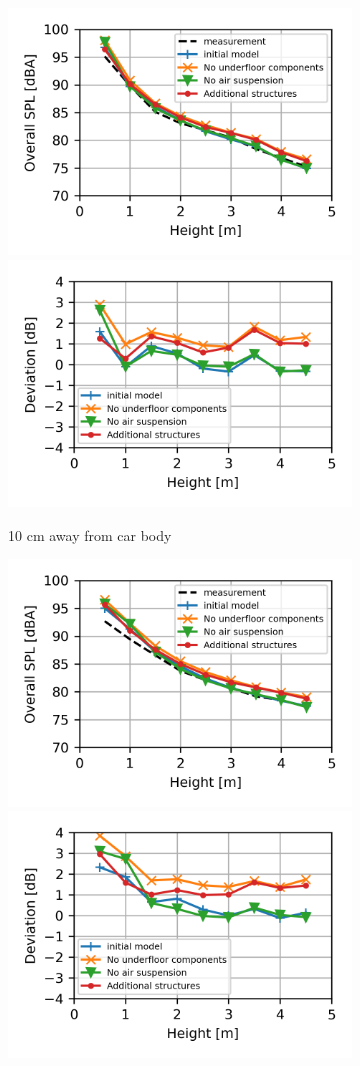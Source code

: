 \begin{figure}[H]
	\centering
	\begin{subfigure}[b]{\textwidth}
		\centering
		\includegraphics[width=0.49\linewidth]{fig/chap5/geometry_variation/overall_SPL/pos_a.png}
		\includegraphics[width=0.49\linewidth]{fig/chap5/geometry_variation/overall_SPL/pos_a_deviation.png}
		\caption{10 cm away from car body}
	\end{subfigure}
	\begin{subfigure}[b]{\textwidth}
		\centering
		\includegraphics[width=0.49\linewidth]{fig/chap5/geometry_variation/overall_SPL/pos_f.png}
		\includegraphics[width=0.49\linewidth]{fig/chap5/geometry_variation/overall_SPL/pos_f_deviation.png}

\end{subfigure}
\end{figure}
